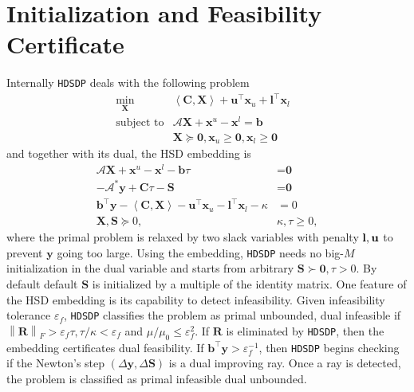 \section{Initialization and Feasibility Certificate} \label{sec4}

Internally {{\texttt{HDSDP}}} deals with the following problem
\begin{eqnarray*}
  \min_{\mathbf{X}} & \left\langle \mathbf{C}, \mathbf{X} \right\rangle + \mathbf{u}^{\top} \mathbf{x}_u +
  \mathbf{l}^{\top} \mathbf{x}_l & \\
  \text{subject to} & \mathcal{A} \mathbf{X} + \mathbf{x}^u - \mathbf{x}^l = \mathbf{b} & \\
  & \mathbf{X} \succeq \textbf{0}, \mathbf{x}_u \geq \textbf{0}, \mathbf{x}_l \geq \textbf{0} & 
\end{eqnarray*}
and together with its dual, the HSD embedding is
\begin{align*}
  \mathcal{A} \mathbf{X} + \mathbf{x}^u - \mathbf{x}^l - \mathbf{b} \tau & = \textbf{0}\\
  - \mathcal{A}^{\ast} \mathbf{y} + \mathbf{C} \tau - \mathbf{S} & = \textbf{0}\\
  \mathbf{b}^{\top} \mathbf{y} - \left\langle \mathbf{C}, \mathbf{X} \right\rangle - \mathbf{u}^{\top} \mathbf{x}_u -
  \mathbf{l}^{\top} \mathbf{x}_l - \kappa & = 0\\
  \mathbf{X}, \mathbf{S} \succeq 0, &  \kappa, \tau \geq 0,
\end{align*}
where the primal problem is relaxed by two slack variables with penalty
$\textbf{{\textbf{l}}}, \mathbf{u}$ to prevent $\mathbf{y}$ going too large. Using the embedding, 
{{\texttt{HDSDP}}} needs no big-$M$ initialization
in the dual variable and starts from arbitrary $\mathbf{S} \succ \textbf{0}, \tau > 0$. By default
default $\mathbf{S}$ is initialized by a multiple of the identity matrix.
One feature of the HSD embedding is its capability to
detect infeasibility. Given infeasibility tolerance $\varepsilon_f$, {{\texttt{HDSDP}}}
classifies the problem as primal unbounded, dual infeasible if $\left\| \mathbf{R}
\right\|_F > \varepsilon_f \tau, \tau / \kappa < \varepsilon_f$ and $\mu /
\mu_0 \leq \varepsilon_f^2$. If $\mathbf{R}$ is eliminated by {{\texttt{HDSDP}}}, then
the embedding certificates dual feasibility. If $\mathbf{b}^{\top} \mathbf{y} >
\varepsilon_f^{- 1}$, then {{\texttt{HDSDP}}} begins checking if the Newton's
step $\left( \Delta \mathbf{y}, \Delta \mathbf{S} \right)$ is a dual improving ray. Once a ray is detected, the problem is classified as primal
infeasible dual unbounded.
